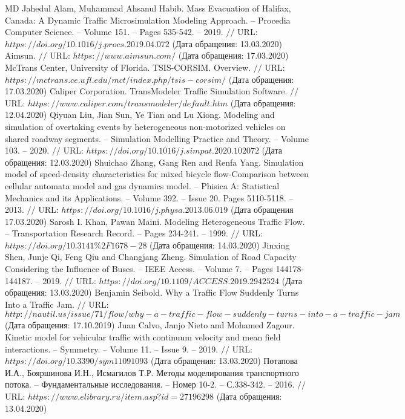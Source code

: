 \begin{thebibliography}{00}
	MD Jahedul Alam, Muhammad Ahsanul Habib. Mass Evacuation of Halifax, Canada: A Dynamic Traffic Microsimulation Modeling Approach. -- Procedia Computer Science. -- Volume 151. -- Pages 535-542. -- 2019. $//$ URL: $https://doi.org/10.1016/j.procs.2019.04.072$ (Дата обращения: 13.03.2020)
	Aimsun. $//$ URL: $https://www.aimsun.com/$ (Дата обращения: 17.03.2020)
	McTrans Center, University of Florida. TSIS-CORSIM. Overview. $//$ URL: $https://mctrans.ce.ufl.edu/mct/index.php/tsis-corsim/$ (Дата обращения: 17.03.2020)
	Caliper Corporation. TransModeler Traffic Simulation Software. $//$ URL: $https://www.caliper.com/transmodeler/default.htm$ (Дата обращения: 12.04.2020)
	Qiyuan Liu, Jian Sun, Ye Tian and Lu Xiong. Modeling and simulation of overtaking events by heterogeneous non-motorized vehicles on shared roadway segments. -- Simulation Modelling Practice and Theory. -- Volume 103. -- 2020. $//$ URL: $https://doi.org/10.1016/j.simpat.2020.102072$ (Дата обращения: 12.03.2020)
	Shuichao Zhang, Gang Ren and Renfa Yang. Simulation model of speed-density characteristics for mixed bicycle flow-Comparison between cellular automata model and gas dynamics model. -- Phisica A: Statistical Mechanics and its Applications. -- Volume 392. -- Issue 20. Pages 5110-5118. -- 2013. $//$ URL: $https://doi.org/10.1016/j.physa.2013.06.019$ (Дата обращения 17.03.2020)
	Sarosh I. Khan, Pawan Maini. Modeling Heterogeneous Traffic Flow. -- Transportation Research Record. -- Pages 234-241. -- 1999. $//$ URL: $https://doi.org/10.3141\%2F1678-28$ (Дата обращения: 14.03.2020)
	Jinxing Shen, Junje Qi, Feng Qiu and Changjang Zheng. Simulation of Road Capacity Considering the Influence of Buses. -- IEEE Access. -- Volume 7. -- Pages 144178-144187. -- 2019. $//$ URL: $https://doi.org/10.1109/ACCESS.2019.2942524$ (Дата обращения: 13.03.2020)
	Benjamin Seibold. Why a Traffic Flow Suddenly Turns Into a Traffic Jam. $//$ URL: $http://nautil.us/issue/71/flow/why-a-traffic-flow-suddenly-turns-into-a-traffic-jam$ (Дата обращения: 17.10.2019)
	Juan Calvo, Janjo Nieto and Mohamed Zagour. Kinetic model for vehicular traffic with continuum velocity and mean field interactions. -- Symmetry. -- Volume 11. -- Issue 9. -- 2019. $//$ URL: $https://doi.org/10.3390/sym11091093$ (Дата обращения: 13.03.2020)
	Потапова И.А., Бояршинова И.Н., Исмагилов Т.Р. Методы моделирования транспортного потока. --  Фундаментальные исследования. -- Номер 10-2. -- С.338-342. -- 2016. $//$ URL: $https://www.elibrary.ru/item.asp?id=27196298$ (Дата обращения: 13.04.2020)

\end{thebibliography}
